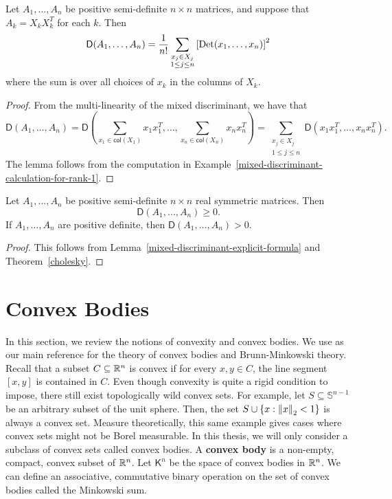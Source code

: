 \documentclass{puthesis-UG}
\begin{document}
\begin{lem}  \label{mixed-discriminant-explicit-formula}
	Let $A_1, \ldots, A_n$ be positive semi-definite $n \times n$ matrices, and suppose that $A_k = X_k X_k^T$ for each $k$. Then
	\[
		\mathsf{D} (A_1, \ldots, A_n) = \frac{1}{n!} \sum_{\substack{x_j \in X_j \\ 1 \leq j \leq n}} \left [ \operatorname{Det}(x_1, \ldots, x_n) \right ]^2
	\]
	where the sum is over all choices of $x_k$ in the columns of $X_k$. 
\end{lem}

\begin{proof}
	From the multi-linearity of the mixed discriminant, we have that 
	\[
		\mathsf{D}(A_1, \ldots, A_n) = \mathsf{D} \left ( \sum_{x_1 \in \mathsf{col}(X_1)} x_1x_1^T, \ldots, \sum_{x_n \in \mathsf{col}(X_n)} x_nx_n^T \right ) = \sum_{\substack{x_j \in X_j \\ 1 \leq j \leq n}} \mathsf{D} (x_1x_1^T, \ldots, x_nx_n^T).
	\]
	The lemma follows from the computation in Example~\ref{mixed-discriminant-calculation-for-rank-1}. 
\end{proof}

\begin{cor} \label{final-positivity-corollary}
	Let $A_1, \ldots, A_n$ be positive semi-definite $n \times n$ real symmetric matrices. Then 
	\[
		\mathsf{D}(A_1, \ldots, A_n) \geq 0.
	\]	
	If $A_1, \ldots, A_n$ are positive definite, then $\mathsf{D}(A_1, \ldots, A_n) > 0$. 
\end{cor}

\begin{proof}
	This follows from Lemma~\ref{mixed-discriminant-explicit-formula} and Theorem~\ref{cholesky}. 
\end{proof}

\section{Convex Bodies} \label{sec:convex-bodies}

In this section, we review the notions of convexity and convex bodies. We use \cite{schneider_2013} as our main reference for the theory of convex bodies and Brunn-Minkowski theory. Recall that a subset $C \subseteq \mathbb{R}^n$ is convex if for every $x, y \in C$, the line segment $[x, y]$ is contained in $C$. Even though convexity is quite a rigid condition to impose, there still exist topologically wild convex sets. For example, let $S \subseteq \mathbb{S}^{n-1}$ be an arbitrary subset of the unit sphere. Then, the set $S \cup \{x : \left\lVert x\right\rVert_2 < 1\}$ is always a convex set. Measure theoretically, this same example gives cases where convex sets might not be Borel measurable. In this thesis, we will only consider a subclass of convex sets called convex bodies. A \textbf{convex body} is a non-empty, compact, convex subset of $\mathbb{R}^n$. Let $\mathsf{K}^n$ be the space of convex bodies in $\mathbb{R}^n$. We can define an associative, commutative binary operation on the set of convex bodies called the Minkowski sum. 
\end{document}
